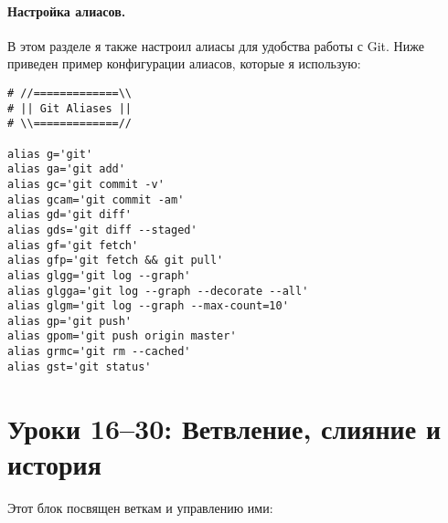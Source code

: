 \label{fig:git_immersion_staging}

\paragraph{Настройка алиасов.} В этом разделе я также настроил алиасы для удобства работы с Git.
Ниже приведен пример конфигурации алиасов, которые я использую:
\begin{verbatim}
# //=============\\
# || Git Aliases ||
# \\=============//

alias g='git'
alias ga='git add'
alias gc='git commit -v'
alias gcam='git commit -am'
alias gd='git diff'
alias gds='git diff --staged'
alias gf='git fetch'
alias gfp='git fetch && git pull'
alias glgg='git log --graph'
alias glgga='git log --graph --decorate --all'
alias glgm='git log --graph --max-count=10'
alias gp='git push'
alias gpom='git push origin master'
alias grmc='git rm --cached'
alias gst='git status'

\end{verbatim}

\clearpage


\section{Уроки 16--30: Ветвление, слияние и история}\label{sec:16-30}
Этот блок посвящен веткам и управлению ими:

